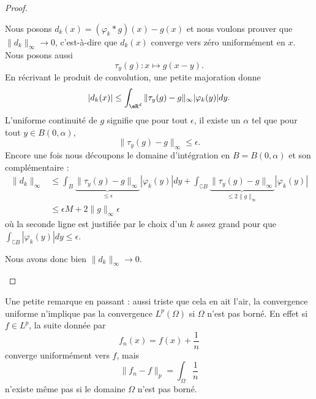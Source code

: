 \begin{proof}
\begin{enumerate}
            Nous posons \( d_k(x)=(\varphi_k*g)(x)-g(x)\) et nous voulons prouver que \( \| d_k \|_{\infty}\to 0\), c'est-à-dire que \( d_k(x)\) converge vers zéro uniformément en \( x\). Nous posons aussi
            \begin{equation}
                \tau_y(g)\colon x\mapsto g(x-y).
            \end{equation}
            En récrivant le produit de convolution, une petite majoration donne
            \begin{equation}
                | d_k(x) |\leq \int_{\eR^d}\| \tau_y(g)-g \|_{\infty}| \varphi_k(y) |dy.
            \end{equation}
            L'uniforme continuité de \( g\) signifie que pour tout \( \epsilon\), il existe un \( \alpha\) tel que pour tout \( y\in B(0,\alpha)\),
            \begin{equation}
                \| \tau_y(g)-g \|_{\infty}\leq \epsilon.
            \end{equation}
            Encore une fois nous découpons le domaine d'intégration en \( B=B(0,\alpha)\) et son complémentaire :
            \begin{subequations}
                \begin{align}
                    \| d_k \|_{\infty}&\leq\int_B\underbrace{\| \tau_y(g)-g \|_{\infty}}_{\leq \epsilon}| \varphi_k(y) |dy+\int_{\complement B}\underbrace{\| \tau_y(g)-g \|_{\infty}}_{\leq 2\| g \|_{\infty}}| \varphi_k(y) |\\
                    &\leq \epsilon M+2\| g \|_{\infty}\epsilon
                \end{align}
            \end{subequations}
            où la seconde ligne est justifiée par le choix d'un \( k\) assez grand pour que \( \int_{\complement B}| \varphi_k(y) |dy\leq \epsilon\).

            Nous avons donc bien \( \| d_k \|_{\infty}\to 0\).
    \end{enumerate}
\end{proof}

\begin{example}
    Une petite remarque en passant : aussi triste que cela en ait l'air, la convergence uniforme n'implique pas la convergence \( L^p(\Omega)\) si \( \Omega\) n'est pas borné. En effet si \( f\in L^p\), la suite donnée par
    \begin{equation}
        f_n(x)=f(x)+\frac{1}{ n }
    \end{equation}
    converge uniformément vers \( f\), mais
    \begin{equation}
        \| f_n-f \|_p=\int_{\Omega}\frac{1}{ n }
    \end{equation}
    n'existe même pas si le domaine \( \Omega\) n'est pas borné.
\end{example}

